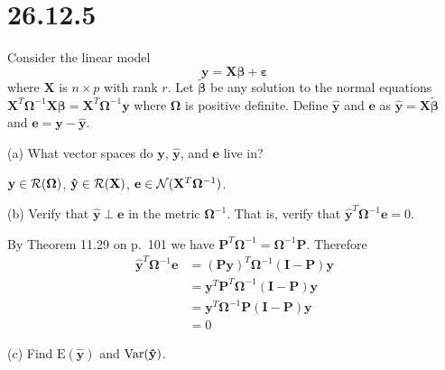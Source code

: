 
\section*{26.12.5}
Consider the linear model
\[
\mathbf y=\mathbf X\bm\beta+\bm\varepsilon
\]
where $\mathbf X$ is $n\times p$ with rank $r$.
Let $\bm{\tilde\beta}$ be any solution to the normal equations
$\mathbf X^T\bm\Omega^{-1}\mathbf X\bm\beta
=\mathbf X^T\bm\Omega^{-1}\mathbf y$ where $\bm\Omega$
is positive definite.
Define $\mathbf{\hat y}$ and $\mathbf e$ as
$\mathbf{\hat y}=\mathbf X\bm{\tilde\beta}$ and
$\mathbf e=\mathbf y-\mathbf{\hat y}$.

\bigskip
\noindent
(a) What vector spaces do $\mathbf y$, $\mathbf{\hat y}$,
and $\mathbf e$ live in?

\bigskip
\noindent
$\mathbf y\in{\cal R}(\bm\Omega)$,
$\mathbf{\hat y}\in{\cal R}(\mathbf X)$,
$\mathbf e\in{\cal N}(\mathbf X^T\bm\Omega^{-1})$.

\bigskip
\noindent
(b) Verify that $\mathbf{\hat y}\perp\mathbf e$ in the metric
$\bm\Omega^{-1}$.
That is, verify that $\mathbf{\hat y}^T\bm\Omega^{-1}\mathbf e=0$.

\bigskip
\noindent
By Theorem 11.29 on p.\ 101 we have
$\mathbf P^T\bm\Omega^{-1}=\bm\Omega^{-1}\mathbf P$.
Therefore
\begin{align*}
\mathbf{\hat y}^T\bm\Omega^{-1}\mathbf e
&=(\mathbf{Py})^T\bm\Omega^{-1}(\mathbf I-\mathbf P)\mathbf y\\
&=\mathbf y^T\mathbf P^T\bm\Omega^{-1}(\mathbf I-\mathbf P)
\mathbf y\\
&=\mathbf y^T\bm\Omega^{-1}\mathbf P(\mathbf I-\mathbf P)\mathbf y\\
&=0
\end{align*}

\bigskip
\noindent
(c) Find $\mathrm E(\mathbf{\hat y})$ and
$\mathop{\rm Var}(\mathbf{\hat y})$.

